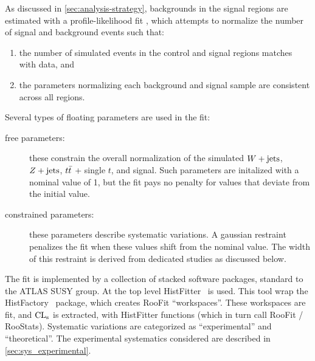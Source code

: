 As discussed in \cref{sec:analysis-strategy}, backgrounds in the
signal regions are estimated with a profile-likelihood fit
\cite{histfactory}, which attempts to normalize the number of signal and background events such that:
\begin{enumerate}
\item the number of simulated events in the control and signal regions
  matches with data, and
\item the parameters normalizing each background and signal sample are
  consistent across all regions.
\end{enumerate}
Several types of floating parameters are used in the fit:
\begin{description}
\item[free parameters:] these constrain the
  overall normalization of the simulated $W + \text{jets}$,
  $Z + \text{jets}$, $t \bar{t}$ + single $t$, and
  signal. Such parameters are initalized with a nominal value of 1,
  but the fit pays no penalty for values that deviate from the initial
  value.
\item[constrained parameters:] these
  parameters describe systematic variations. A gaussian restraint
  penalizes the fit when these values shift from the nominal
  value. The width of this restraint is derived from dedicated
  studies as discussed below.
\end{description}

The fit is implemented by a collection of stacked software packages,
standard to the ATLAS SUSY group. At the top level
HistFitter~\cite{histfitter} is used. This tool wrap the
HistFactory~\cite{histfactory} package, which creates RooFit
``workspaces''. These workspaces are fit, and $\mathrm{CL}_{\mathrm{s}}$ is extracted, with
HistFitter functions (which in turn call RooFit /
RooStats). Systematic variations are categorized as ``experimental''
and ``theoretical''. The experimental systematics considered are described in \cref{sec:sys_experimental}.


